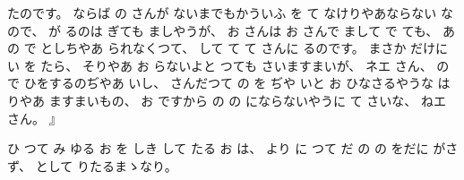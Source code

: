 たのです。
%
ならば
の
さんが
ないまでもかういふ
を
て
なけりやあならない
なので、
%
が
るのは
ぎても
ましやうが、
%
お
さんは
お
さんで
まして
で
ても、
%
あ
の
で
としちやあ
られなくつて、
%
して
て
て
さんに
るのです。
%
まさか
だけに
い
を
たら、
%
そりやあ
お
らないよと
つても
さいますまいが、
%
ネエ
さん、
%
の
で
ひをするのぢやあ
いし、
%
さんだつて
の
を
ぢや%
いと
お
ひなさるやうな
は
りやあ
ますまいもの、
%
お
ですから
の
の
にならないやうに
て
さいな、
%
ねエ
さん。
』

%
ひ
つて
み
ゆる
お
を
しき
して
たる
お
は、
%
より
に
つて
だ
の
の
をだに
がさず、
%
として
りたるまゝなり。

